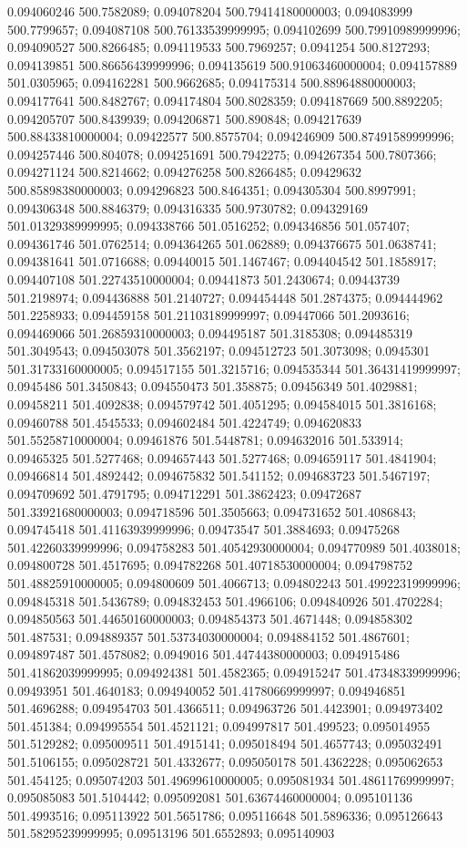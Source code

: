0.094060246 500.7582089; 0.094078204 500.79414180000003; 0.094083999 500.7799657; 0.094087108 500.76133539999995; 0.094102699 500.79910989999996; 0.094090527 500.8266485; 0.094119533 500.7969257; 0.0941254 500.8127293; 0.094139851 500.86656439999996; 0.094135619 500.91063460000004; 0.094157889 501.0305965; 0.094162281 500.9662685; 0.094175314 500.88964880000003; 0.094177641 500.8482767; 0.094174804 500.8028359; 0.094187669 500.8892205; 0.094205707 500.8439939; 0.094206871 500.890848; 0.094217639 500.88433810000004; 0.09422577 500.8575704; 0.094246909 500.87491589999996; 0.094257446 500.804078; 0.094251691 500.7942275; 0.094267354 500.7807366; 0.094271124 500.8214662; 0.094276258 500.8266485; 0.09429632 500.85898380000003; 0.094296823 500.8464351; 0.094305304 500.8997991; 0.094306348 500.8846379; 0.094316335 500.9730782; 0.094329169 501.01329389999995; 0.094338766 501.0516252; 0.094346856 501.057407; 0.094361746 501.0762514; 0.094364265 501.062889; 0.094376675 501.0638741; 0.094381641 501.0716688; 0.09440015 501.1467467; 0.094404542 501.1858917; 0.094407108 501.22743510000004; 0.09441873 501.2430674; 0.09443739 501.2198974; 0.094436888 501.2140727; 0.094454448 501.2874375; 0.094444962 501.2258933; 0.094459158 501.21103189999997; 0.09447066 501.2093616; 0.094469066 501.26859310000003; 0.094495187 501.3185308; 0.094485319 501.3049543; 0.094503078 501.3562197; 0.094512723 501.3073098; 0.0945301 501.31733160000005; 0.094517155 501.3215716; 0.094535344 501.36431419999997; 0.0945486 501.3450843; 0.094550473 501.358875; 0.09456349 501.4029881; 0.09458211 501.4092838; 0.094579742 501.4051295; 0.094584015 501.3816168; 0.09460788 501.4545533; 0.094602484 501.4224749; 0.094620833 501.55258710000004; 0.09461876 501.5448781; 0.094632016 501.533914; 0.09465325 501.5277468; 0.094657443 501.5277468; 0.094659117 501.4841904; 0.09466814 501.4892442; 0.094675832 501.541152; 0.094683723 501.5467197; 0.094709692 501.4791795; 0.094712291 501.3862423; 0.09472687 501.33921680000003; 0.094718596 501.3505663; 0.094731652 501.4086843; 0.094745418 501.41163939999996; 0.09473547 501.3884693; 0.09475268 501.42260339999996; 0.094758283 501.40542930000004; 0.094770989 501.4038018; 0.094800728 501.4517695; 0.094782268 501.40718530000004; 0.094798752 501.48825910000005; 0.094800609 501.4066713; 0.094802243 501.49922319999996; 0.094845318 501.5436789; 0.094832453 501.4966106; 0.094840926 501.4702284; 0.094850563 501.44650160000003; 0.094854373 501.4671448; 0.094858302 501.487531; 0.094889357 501.53734030000004; 0.094884152 501.4867601; 0.094897487 501.4578082; 0.0949016 501.44744380000003; 0.094915486 501.41862039999995; 0.094924381 501.4582365; 0.094915247 501.47348339999996; 0.09493951 501.4640183; 0.094940052 501.41780669999997; 0.094946851 501.4696288; 0.094954703 501.4366511; 0.094963726 501.4423901; 0.094973402 501.451384; 0.094995554 501.4521121; 0.094997817 501.499523; 0.095014955 501.5129282; 0.095009511 501.4915141; 0.095018494 501.4657743; 0.095032491 501.5106155; 0.095028721 501.4332677; 0.095050178 501.4362228; 0.095062653 501.454125; 0.095074203 501.49699610000005; 0.095081934 501.48611769999997; 0.095085083 501.5104442; 0.095092081 501.63674460000004; 0.095101136 501.4993516; 0.095113922 501.5651786; 0.095116648 501.5896336; 0.095126643 501.58295239999995; 0.09513196 501.6552893; 0.095140903 